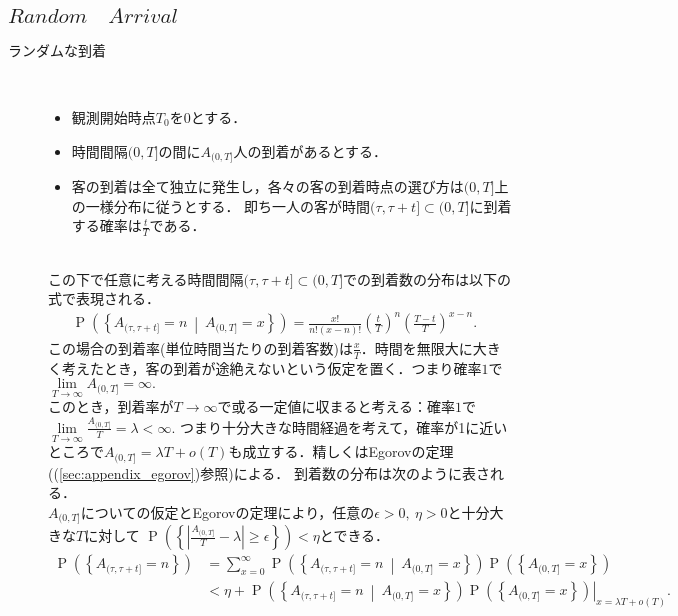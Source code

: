 \documentclass[a4j,papersize,disablejfam,slide,14pt]{jsarticle}
\def\prob#1{\operatorname{P} \left(\left\{ #1 \right\}\right)} %
\def\cprob#1#2{\operatorname{P} \left(\left\{ #1 \ \middle|\ #2 \right\}\right)} %
\begin{document}
\subsection{$Random\quad Arrival$}
    \begin{description}
    	\item[ランダムな到着]\mbox{}\\
        	\begin{itemize}
    			\item 観測開始時点$T_0$を$0$とする．
        		\item 時間間隔$(0, T]$の間に$A_{(0, T]}$人の到着があるとする．
        		\item 客の到着は全て独立に発生し，各々の客の到着時点の選び方は$(0, T]$上の一様分布に従うとする．
                即ち一人の客が時間$(\tau, \tau + t] \subset (0, T]$に到着する確率は$\frac{t}{T}$である．
            \end{itemize}
            \mbox{}\\
        	この下で任意に考える時間間隔$(\tau, \tau + t] \subset (0, T]$での到着数の分布は以下の式で表現される．
        	\begin{align}
        		\cprob{A_{(\tau, \tau + t]} = n}{A_{(0, T]}=x} = \frac{x!}{n!(x-n)!} \left( \frac{t}{T} \right)^n \left( \frac{T-t}{T} \right)^{x-n}. & \label{eq:random_arrival}
        	\end{align}
        	この場合の到着率(単位時間当たりの到着客数)は$\frac{x}{T}$．時間を無限大に大きく考えたとき，客の到着が途絶えないという仮定を置く．つまり確率$1$で
            $\lim\limits_{T \to \infty} A_{(0, T]}=\infty.$ \\
        	このとき，到着率が$T \to \infty$で或る一定値に収まると考える：確率$1$で$\lim\limits_{T \to \infty} \frac{A_{(0, T]}}{T} = \lambda < \infty.$
        	つまり十分大きな時間経過を考えて，確率が1に近いところで$A_{(0, T]} = \lambda T + o(T)$も成立する．精しくは{\rm Egorov}の定理((\ref{sec:appendix_egorov})参照)による．
            到着数の分布は次のように表される．\\
            $A_{(0, T]}$についての仮定と{\rm Egorov}の定理により，任意の$\epsilon > 0,\ \eta > 0$と十分大きな$T$に対して
            $\prob{ \left|\frac{A_{(0, T]}}{T} - \lambda \right| \geq \epsilon} < \eta$とできる．
        	\begin{align}
        		\prob{A_{(\tau, \tau + t]} = n} &= \sum_{x=0}^{\infty} \cprob{A_{(\tau, \tau + t]} = n}{A_{(0, T]}=x} \prob{A_{(0, T]}=x} \\
                &< \eta + \left. \cprob{A_{(\tau, \tau + t]} = n}{A_{(0, T]}=x} \prob{A_{(0, T]}=x} \right|_{x=\lambda T + o(T)}.

\end{align}
\end{description}
\end{document}
